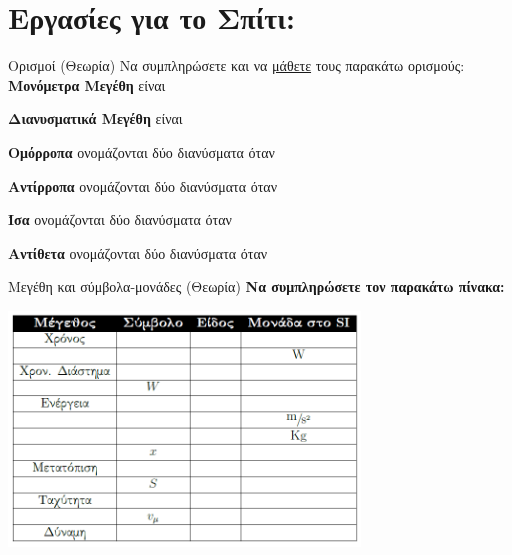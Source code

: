 \section{Εργασίες για το Σπίτι:}
\begin{ergasia}{Ορισμοί (Θεωρία)}
Να συμπληρώσετε και να \underline{μάθετε} τους παρακάτω ορισμούς:
\tcblower
\textbf{Μονόμετρα Μεγέθη} είναι\\

\vspace{1.6cm}

\textbf{Διανυσματικά Μεγέθη} είναι\\

\vspace{1.6cm}

\textbf{Ομόρροπα} ονομάζονται δύο διανύσματα όταν\\

\vspace{1.6cm}

\textbf{Αντίρροπα} ονομάζονται δύο διανύσματα όταν\\

\vspace{1.6cm}

\textbf{Ίσα} ονομάζονται δύο διανύσματα όταν\\

\vspace{1.6cm}

\textbf{Αντίθετα} ονομάζονται δύο διανύσματα όταν\\

\vspace{1.6cm}
\end{ergasia}

\clearpage

\begin{ergasia}{Μεγέθη και σύμβολα-μονάδες (Θεωρία)}
\textbf{Να συμπληρώσετε τον παρακάτω πίνακα:}

\begin{center}
\includegraphics[width=0.7\textwidth]{images/pinakasaskisis.png}
\end{center}

\end{ergasia}


